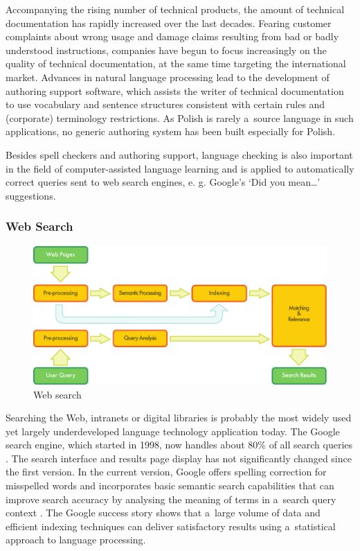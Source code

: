 \begin{multicols}{2}

Accompanying the rising number of technical products, the amount of
technical documentation has rapidly increased over the last decades.
Fearing customer complaints about wrong usage and damage claims
resulting from bad or badly understood instructions, companies have
begun to focus increasingly on the quality of technical documentation,
at the same time targeting the international market. Advances in
natural language processing lead to the development of authoring
support software, which assists the writer of technical documentation
to use vocabulary and sentence structures consistent with certain
rules and (corporate) terminology restrictions. As Polish is rarely
a~source language in such applications, no generic authoring system
has been built especially for Polish. 

Besides spell checkers and authoring support, language checking is
also important in the field of computer-assisted language learning and
is applied to automatically correct queries sent to web search
engines, e. g. Google’s ‘Did you mean…’ suggestions. 

\subsubsection{Web Search} 

\begin{figure}[t]  \center
\includegraphics[width=\textwidth]{../_media/english/web_search_architecture}
\caption{Web search} \label{fig:websearcharch_en}
 \end{figure} 

Searching the Web, intranets or digital libraries is probably the most
widely used yet largely underdeveloped language technology application
today. The Google search engine, which started in 1998, now handles
about 80\% of all search queries \cite{spi1}. The search interface and
results page display has not significantly changed since the first
version. In the current version, Google offers spelling correction for
misspelled words and incorporates basic semantic search capabilities
that can improve search accuracy by analysing the meaning of terms in
a~search query context \cite{pc1}. The Google success story shows that
a~large volume of data and efficient indexing techniques can deliver
satisfactory results using a~statistical approach to language
processing. 


\end{multicols}
